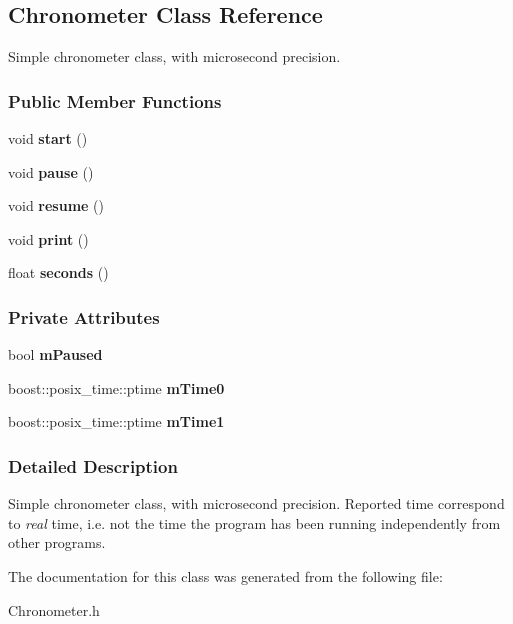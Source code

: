\subsection{Chronometer Class Reference}
\label{a00015}


Simple chronometer class, with microsecond precision.  
\subsubsection*{Public Member Functions}
\begin{DoxyCompactItemize}
\item 
void {\bfseries start} ()\label{a00015_aef429cdb6aae70bf6a8b540e426efb96}

\item 
void {\bfseries pause} ()\label{a00015_a5ec9df9b8c17e695bc5cce5607df0380}

\item 
void {\bfseries resume} ()\label{a00015_ac98118472c0cc0691d9891e1173f86a9}

\item 
void {\bfseries print} ()\label{a00015_a249f804f5f815299ecdb999fb3b10229}

\item 
float {\bfseries seconds} ()\label{a00015_aec1d1b7317d9ad05e923b65855b6a49b}

\end{DoxyCompactItemize}
\subsubsection*{Private Attributes}
\begin{DoxyCompactItemize}
\item 
bool {\bfseries mPaused}\label{a00015_a690e9d4287d4780546da0199f16b92ac}

\item 
boost::posix\_\-time::ptime {\bfseries mTime0}\label{a00015_ad9d1b8f615bfac6a1133202047fe3d48}

\item 
boost::posix\_\-time::ptime {\bfseries mTime1}\label{a00015_a1f74a906486b1a1d3d69519a41d9e33c}

\end{DoxyCompactItemize}


\subsubsection{Detailed Description}
Simple chronometer class, with microsecond precision. Reported time correspond to {\itshape real\/} time, i.e. not the time the program has been running independently from other programs. 

The documentation for this class was generated from the following file:\begin{DoxyCompactItemize}
\item 
Chronometer.h\end{DoxyCompactItemize}
